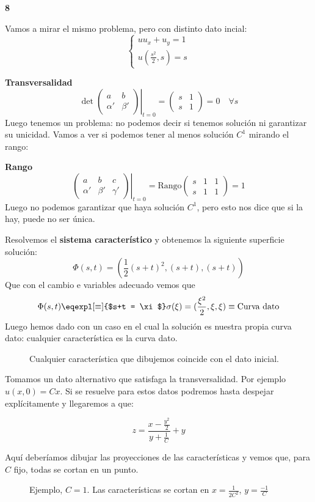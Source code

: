 	\begin{example}{\bf 8}

		Vamos a mirar el mismo problema, pero con distinto dato incial:
		\[
		\left\{
		\begin{array}{l}
			uu_x+ u_y = 1\\
			u(\frac{s^2}{2}, s) = s
		\end{array}
		\right.
		\]

		{\bf Transversalidad}
		\[ \det \left. \begin{pmatrix}
			a & b\\
			\alpha' & \beta'
		\end{pmatrix} \right|_{t=0} =
		\begin{pmatrix}
			s & 1\\
			s & 1
		\end{pmatrix} =
		0\quad \forall s\]
		Luego tenemos un problema: no podemos decir si tenemos solución ni garantizar su unicidad. Vamos a ver si podemos tener al menos solución $C^1$ mirando el rango:

		{\bf Rango}
		\[
		\left. \begin{pmatrix}
			a & b & c \\
			\alpha' & \beta' & \gamma'
		\end{pmatrix}
		\right|_{t=0} = \text{Rango}
		\begin{pmatrix}
			s &1 & 1 \\
			s &1 & 1
		\end{pmatrix} = 1
		\]
		Luego no podemos garantizar que haya solución $C^1$, pero esto nos dice que si la hay, puede no ser única.

		Resolvemos el {\bf sistema característico} y obtenemos la siguiente superficie solución:
		\[
		\Phi(s,t) = (\frac{1}{2}(s+t)^2, (s+t), (s+t))
		\]
		Que con el cambio e variables adecuado vemos que
		\[ \Phi(s,t) \eqexpl[\equiv]{$s+t = \xi$} \sigma(\xi) = (\frac{\xi^2}{2}, \xi, \xi) \equiv \text{Curva dato} \]
		Luego hemos dado con un caso en el cual la solución es nuestra propia curva dato: cualquier característica es la curva dato.

		\begin{figure}[hbtp]
			\caption{Cualquier característica que dibujemos coincide con el dato inicial.}
			\label{fig:Ejemplo-Dato-Y-Sol-Coinciden}
		\end{figure}

		Tomamos un dato alternativo que satisfaga la transversalidad. Por ejemplo $u(x,0) = Cx$. Si se resuelve para estos datos podremos hasta despejar explícitamente y llegaremos a que:

		\[ z = \frac{x-\frac{y^2}{2}}{y + \frac{1}{C}}+y
		\]

		Aquí deberíamos dibujar las proyecciones de las características y vemos que, para $C$ fijo, todas se cortan en un punto.

		\begin{figure}[hbtp]
			\caption{Ejemplo, $C=1$. Las características se cortan en $x=\frac{1}{2 C^2}$, $y = \frac{-1}{C}$}
			\label{fig:Ejemplo8-Caract-C1}
		\end{figure}

	\end{example}
